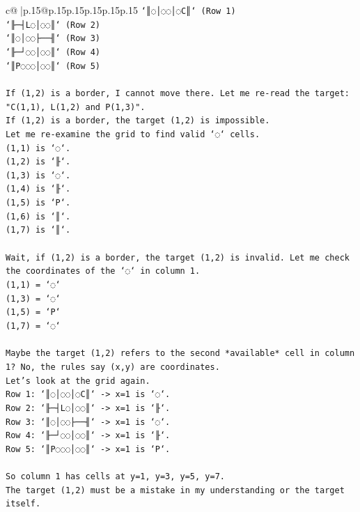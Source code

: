 \documentclass{article}
\begin{document}
{\begin{supertabular}{c@{$\;$}|p{.15\linewidth}@{}p{.15\linewidth}p{.15\linewidth}p{.15\linewidth}p{.15\linewidth}p{.15\linewidth}}
{{{\texttt{`║◌│◌◌│◌C║` (Row 1)} \\
\texttt{`╟─┤L◌│◌◌║` (Row 2)} \\
\texttt{`║◌│◌◌├──╢` (Row 3)} \\
\texttt{`╟─┘◌◌│◌◌║` (Row 4)} \\
\texttt{`║P◌◌◌│◌◌║` (Row 5)} \\
\\ 
\texttt{If (1,2) is a border, I cannot move there. Let me re{-}read the target: "C(1,1), L(1,2) and P(1,3)".} \\
\texttt{If (1,2) is a border, the target (1,2) is impossible.} \\
\texttt{Let me re{-}examine the grid to find valid `◌` cells.} \\
\texttt{(1,1) is `◌`.} \\
\texttt{(1,2) is `╟`.} \\
\texttt{(1,3) is `◌`.} \\
\texttt{(1,4) is `╟`.} \\
\texttt{(1,5) is `P`.} \\
\texttt{(1,6) is `║`.} \\
\texttt{(1,7) is `║`.} \\
\\ 
\texttt{Wait, if (1,2) is a border, the target (1,2) is invalid. Let me check the coordinates of the `◌` in column 1.} \\
\texttt{(1,1) = `◌`} \\
\texttt{(1,3) = `◌`} \\
\texttt{(1,5) = `P`} \\
\texttt{(1,7) = `◌`} \\
\\ 
\texttt{Maybe the target (1,2) refers to the second *available* cell in column 1? No, the rules say (x,y) are coordinates.} \\
\texttt{Let's look at the grid again.} \\
\texttt{Row 1: `║◌│◌◌│◌C║` {-}> x=1 is `◌`.} \\
\texttt{Row 2: `╟─┤L◌│◌◌║` {-}> x=1 is `╟`.} \\
\texttt{Row 3: `║◌│◌◌├──╢` {-}> x=1 is `◌`.} \\
\texttt{Row 4: `╟─┘◌◌│◌◌║` {-}> x=1 is `╟`.} \\
\texttt{Row 5: `║P◌◌◌│◌◌║` {-}> x=1 is `P`.} \\
\\ 
\texttt{So column 1 has cells at y=1, y=3, y=5, y=7.} \\
\texttt{The target (1,2) must be a mistake in my understanding or the target itself.} \\
}}}
\end{supertabular}}
\end{document}
